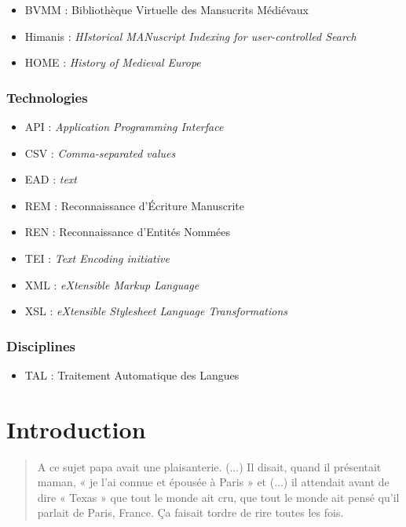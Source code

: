 \documentclass[a4paper,12pt,twoside]{book}
\begin{document}
	\begin{itemize}
		\item BVMM : Bibliothèque Virtuelle des Mansucrits Médiévaux
		\item Himanis : \textit{HIstorical MANuscript Indexing for user-controlled Search}
		\item HOME : \textit{History of Medieval Europe}
	\end{itemize}
	
	\subsection*{Technologies}
	
	\begin{itemize}
		\item API : \textit{Application Programming Interface}
		\item CSV : \textit{Comma-separated values}
		\item EAD : \textit{text}
		\item REM : Reconnaissance d'Écriture Manuscrite
		\item REN : Reconnaissance d'Entités Nommées
		\item TEI : \textit{Text Encoding initiative}
		\item XML : \textit{eXtensible Markup Language}
		\item XSL : \textit{eXtensible Stylesheet Language Transformations}
	\end{itemize}

	\subsection*{Disciplines}
	
	\begin{itemize}
		\item TAL : Traitement Automatique des Langues
	\end{itemize}

	
	\printbibliography
	
	\chapter{Introduction}
	
	\begin{quotation}
		
	A ce sujet papa avait une plaisanterie. (...) Il disait, quand il présentait maman, « je l’ai connue et épousée à Paris » et (...) il attendait avant de dire « Texas » que tout le monde ait cru, que tout le monde ait pensé qu’il parlait de Paris, France. Ça faisait tordre de rire toutes les fois.
	
	\end{quotation}
	\bigbreak
	
\end{document}
